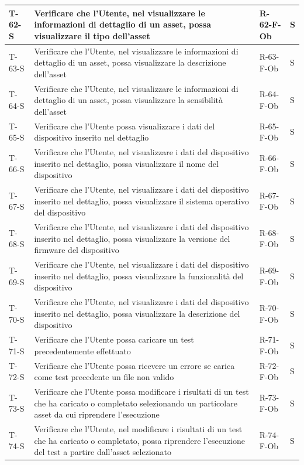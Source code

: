 \documentclass[a4paper,12pt]{article}
\begin{document}
{{\begin{longtable}{|p{}|p{}|p{}|p{}|}
                T-62-S & Verificare che l'Utente, nel visualizzare le informazioni di dettaglio di un asset, possa visualizzare il tipo dell'asset & R-62-F-Ob & S \\ \hline
                T-63-S & Verificare che l'Utente, nel visualizzare le informazioni di dettaglio di un asset, possa visualizzare la descrizione dell'asset & R-63-F-Ob & S \\ \hline
                T-64-S & Verificare che l'Utente, nel visualizzare le informazioni di dettaglio di un asset, possa visualizzare la sensibilità dell'asset & R-64-F-Ob & S \\ \hline
                T-65-S & Verificare che l'Utente possa visualizzare i dati del dispositivo inserito nel dettaglio & R-65-F-Ob & S \\ \hline
                T-66-S & Verificare che l'Utente, nel visualizzare i dati del dispositivo inserito nel dettaglio, possa visualizzare il nome del dispositivo & R-66-F-Ob & S \\ \hline
                T-67-S & Verificare che l'Utente, nel visualizzare i dati del dispositivo inserito nel dettaglio, possa visualizzare il sistema operativo del dispositivo & R-67-F-Ob & S \\ \hline
                T-68-S & Verificare che l'Utente, nel visualizzare i dati del dispositivo inserito nel dettaglio, possa visualizzare la versione del firmware del dispositivo & R-68-F-Ob & S \\ \hline
                T-69-S & Verificare che l'Utente, nel visualizzare i dati del dispositivo inserito nel dettaglio, possa visualizzare la funzionalità del dispositivo & R-69-F-Ob & S \\ \hline
                T-70-S & Verificare che l'Utente, nel visualizzare i dati del dispositivo inserito nel dettaglio, possa visualizzare la descrizione del dispositivo & R-70-F-Ob & S \\ \hline
                T-71-S & Verificare che l'Utente possa caricare un test precedentemente effettuato & R-71-F-Ob & S \\ \hline
                T-72-S & Verificare che l'Utente possa ricevere un errore se carica come test precedente un file non valido & R-72-F-Ob & S \\ \hline
                T-73-S & Verificare che l'Utente possa modificare i risultati di un test che ha caricato o completato selezionando un particolare asset da cui riprendere l'esecuzione & R-73-F-Ob & S \\ \hline
                T-74-S & Verificare che l'Utente, nel modificare i risultati di un test che ha caricato o completato, possa riprendere l'esecuzione del test a partire dall'asset selezionato & R-74-F-Ob & S \\ \hline

\end{longtable}}}
\end{document}
